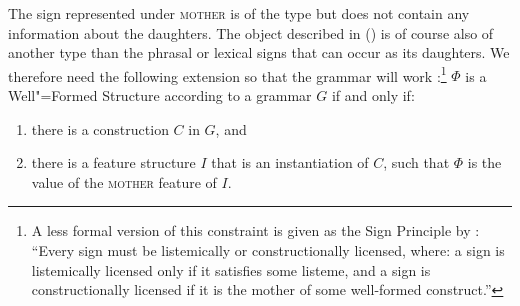 The sign represented under \textsc{mother} is of the type  but does not contain any
information about the daughters.
The object described in () is of course also of another type than the phrasal or lexical signs that can occur as its daughters.
We therefore need the following extension so that the grammar will work \citep*[]{SWB2003a}:\footnote{%
A less formal version of this constraint is given as the Sign Principle by
\citet[]{Sag2012a}: ``Every sign must be listemically or constructionally licensed, where: a
sign is listemically licensed only if it satisfies some listeme, and a sign is constructionally
licensed if it is the mother of some well-formed construct.''
}
\ea
\label{meta-construction-statemnet}
$\Phi$ is a Well"=Formed Structure according to a grammar $G$ if and only if:
\begin{enumerate}
\item there is a construction $C$ in $G$, and
\item there is a feature structure $I$ that is an instantiation of $C$, such that
      $\Phi$ is the value of the \textsc{mother} feature of $I$.
\end{enumerate}
\z


